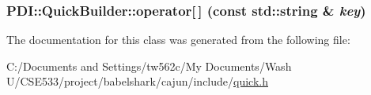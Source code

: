\hypertarget{class_p_d_i_1_1_quick_builder_fa835444ab05199dada82ca90f33151d}{
\subsubsection[{operator[]}]{ PDI::QuickBuilder::operator\mbox{[}$\,$\mbox{]} (const std::string \& {\em key})}}
\label{class_p_d_i_1_1_quick_builder_fa835444ab05199dada82ca90f33151d}




The documentation for this class was generated from the following file:\begin{CompactItemize}
\item 
C:/Documents and Settings/tw562c/My Documents/Wash U/CSE533/project/babelshark/cajun/include/\hyperlink{quick_8h}{quick.h}\end{CompactItemize}
